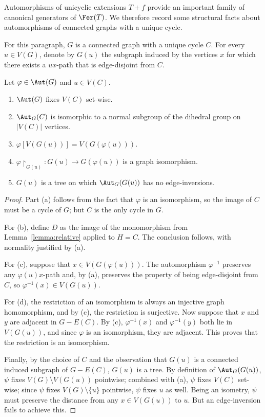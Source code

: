 Automorphisms of unicyclic extensions $T+f$ provide an important family of canonical generators of $\Fer(T)$.
We therefore record some structural facts about automorphisms of connected graphs with a unique cycle.

For this paragraph, $G$ is a connected graph with a unique cycle $C$.
For every $u\in V(G)$, denote by $G(u)$ the subgraph induced by the vertices $x$ for which there exists a $ux$-path that is edge-disjoint from $C$.

\begin{proposition}\label{prop:unicyclic}
    Let $\varphi\in\Aut(G)$ and $u\in V(C)$.
    \begin{enumerate}[label=(\alph*)]
        \item $\Aut(G)$ fixes $V(C)$ set-wise.

        \item $\Aut_G(C)$ is isomorphic to a normal subgroup of the dihedral group on $|V(C)|$ vertices.

        \item $\varphi[V(G(u))]=V(G(\varphi(u)))$.

        \item $\varphi\restriction_{G(u)}\colon G(u)\to G(\varphi(u))$ is a graph isomorphism.

        \item $G(u)$ is a tree on which $\Aut_G(G(u))$ has no edge-inversions.
    \end{enumerate}
\end{proposition}

\begin{proof}
    Part (a) follows from the fact that $\varphi$ is an isomorphism, so the image of $C$ must be a cycle of $G$; but $C$ is the only cycle in $G$.

    For (b), define $D$ as the image of the monomorphism from Lemma~\ref{lemma:relative} applied to $H=C$.
    The conclusion follows, with normality justified by (a).

    For (c), suppose that $x\in V(G(\varphi(u)))$.
    The automorphism $\varphi^{-1}$ preserves any $\varphi(u)x$-path and, by (a), preserves the property of being edge-disjoint from $C$, so $\varphi^{-1}(x)\in V(G(u))$.

    For (d), the restriction of an isomorphism is always an injective graph homomorphism, and by (c), the restriction is surjective.
    Now suppose that $x$ and $y$ are adjacent in $G-E(C)$.
    By (c), $\varphi^{-1}(x)$ and $\varphi^{-1}(y)$ both lie in $V(G(u))$, and since $\varphi$ is an isomorphism, they are adjacent.
    This proves that the restriction is an isomorphism.

    Finally, by the choice of $C$ and the observation that $G(u)$ is a connected induced subgraph of $G-E(C)$, $G(u)$ is a tree.
    By definition of $\Aut_G(G(u))$, $\psi$ fixes $V(G)\setminus V(G(u))$ pointwise; combined with (a), $\psi$ fixes $V(C)$ set-wise; since $\psi$ fixes $V(G)\setminus\{u\}$ pointwise, $\psi$ fixes $u$ as well.
    Being an isometry, $\psi$ must preserve the distance from any $x\in V(G(u))$ to $u$.
    But an edge-inversion fails to achieve this.
\end{proof}


